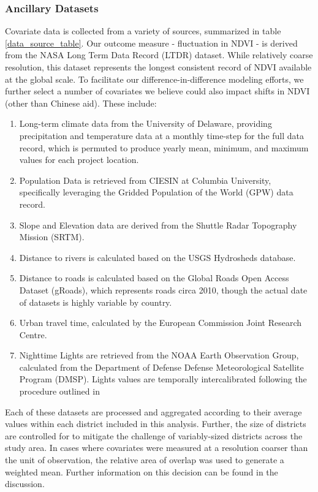 




\subsubsection{Ancillary Datasets}
Covariate data is collected from a variety of sources, summarized in table \ref{data_source_table}.
Our outcome measure - fluctuation in NDVI - is derived from the NASA Long Term Data Record (LTDR) dataset.
While relatively coarse resolution, this dataset represents the longest consistent record of NDVI available at the global scale.
To facilitate our difference-in-difference modeling efforts, we further select a number of covariates we believe could also impact shifts in NDVI (other than Chinese aid).
These include:
\begin{enumerate}
\item{Long-term climate data from the University of Delaware, providing precipitation and temperature data at a monthly time-step for the full data record, which is permuted to produce yearly mean, minimum, and maximum values for each project location.}
\item{Population Data is retrieved from CIESIN at Columbia University, specifically leveraging the Gridded Population of the World (GPW) data record.}
\item{Slope and Elevation data are derived from the Shuttle Radar Topography Mission (SRTM).}
\item{Distance to rivers is calculated based on the USGS Hydrosheds database.}
\item{Distance to roads is calculated based on the Global Roads Open Access Dataset (gRoads), which represents roads circa 2010, though the actual date of datasets is highly variable by country.}
\item{Urban travel time, calculated by the European Commission Joint Research Centre.}
\item{Nighttime Lights are retrieved from the NOAA Earth Observation Group, calculated from the Department of Defense Defense Meteorological Satellite Program (DMSP).  Lights values are temporally intercalibrated following the procedure outlined in \cite{weng_global_2014}}
\end{enumerate}
Each of these datasets are processed and aggregated according to their average values within each district included in this analysis.  
Further, the size of districts are controlled for to mitigate the challenge of variably-sized districts across the study area.
In cases where covariates were measured at a resolution coarser than the unit of observation, the relative area of overlap was used to generate a weighted mean.
Further information on this decision can be found in the discussion.

